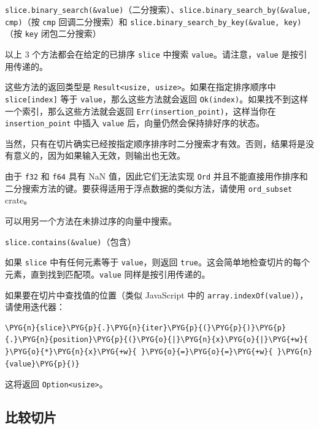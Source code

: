 \begin{myNote}
\texttt{slice.binary\_search(\&value)}（二分搜索）、\texttt{slice.binary\_search\_by(\&value, cmp)}（按 \texttt{cmp} 回调二分搜索）和 \texttt{slice.binary\_search\_by\_key(\&value, key)}（按 \texttt{key} 闭包二分搜索）
\end{myNote}

以上 3 个方法都会在给定的已排序 \texttt{slice} 中搜索 \texttt{value}。请注意，\texttt{value} 是按引用传递的。

这些方法的返回类型是 \texttt{Result<usize, usize>}。如果在指定排序顺序中 \texttt{slice[index]} 等于 \texttt{value}，那么这些方法就会返回 \texttt{Ok(index)}。如果找不到这样一个索引，那么这些方法就会返回 \texttt{Err(insertion\_point)}，这样当你在 \texttt{insertion\_point} 中插入 \texttt{value} 后，向量仍然会保持排好序的状态。

当然，只有在切片确实已经按指定顺序排序时二分搜索才有效。否则，结果将是没有意义的，因为如果输入无效，则输出也无效。

由于 \texttt{f32} 和 \texttt{f64} 具有 NaN 值，因此它们无法实现 \texttt{Ord} 并且不能直接用作排序和二分搜索方法的键。要获得适用于浮点数据的类似方法，请使用 \texttt{ord\_subset} crate。

可以用另一个方法在未排过序的向量中搜索。

\begin{mySidenote}
\texttt{slice.contains(\&value)}（包含）
\end{mySidenote}

如果 \texttt{slice} 中有任何元素等于 \texttt{value}，则返回 \texttt{true}。这会简单地检查切片的每个元素，直到找到匹配项。\texttt{value} 同样是按引用传递的。

如果要在切片中查找值的位置（类似 JavaScript 中的 \texttt{array.indexOf(value)}），请使用迭代器：

\begin{Verbatim}[commandchars=\\\{\},breaklines=true,breakanywhere=true,fontsize=\codefont,xleftmargin=17bp]
\PYG{n}{slice}\PYG{p}{.}\PYG{n}{iter}\PYG{p}{(}\PYG{p}{)}\PYG{p}{.}\PYG{n}{position}\PYG{p}{(}\PYG{o}{|}\PYG{n}{x}\PYG{o}{|}\PYG{+w}{ }\PYG{o}{*}\PYG{n}{x}\PYG{+w}{ }\PYG{o}{=}\PYG{o}{=}\PYG{+w}{ }\PYG{n}{value}\PYG{p}{)}
\end{Verbatim}

这将返回 \texttt{Option<usize>}。

\subsection{比较切片}

